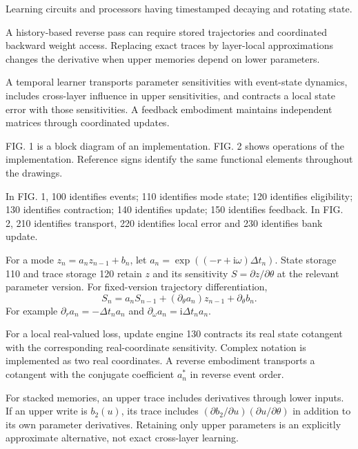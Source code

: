 \documentclass[pct]{sm-patent}
\begin{document}
\descriptionstart


\pnum Learning circuits and processors having timestamped decaying and rotating state.


\pnum A history-based reverse pass can require stored trajectories and coordinated backward weight access. Replacing exact traces by layer-local approximations changes the derivative when upper memories depend on lower parameters.


\pnum A temporal learner transports parameter sensitivities with event-state dynamics, includes cross-layer influence in upper sensitivities, and contracts a local state error with those sensitivities. A feedback embodiment maintains independent matrices through coordinated updates.


\pnum FIG. 1 is a block diagram of an implementation. FIG. 2 shows operations of the implementation. Reference signs identify the same functional elements throughout the drawings.


\pnum In FIG. 1, 100 identifies events; 110 identifies mode state; 120 identifies eligibility; 130 identifies contraction; 140 identifies update; 150 identifies feedback. In FIG. 2, 210 identifies transport, 220 identifies local error and 230 identifies bank update.

\pnum For a mode $z_n=a_nz_{n-1}+b_n$, let $a_n=\exp((-r+\mathrm{i}\omega)\Delta t_n)$. State storage 110 and trace storage 120 retain $z$ and its sensitivity $S=\partial z/\partial\theta$ at the relevant parameter version. For fixed-version trajectory differentiation,
\[S_n=a_n S_{n-1}+(\partial_\theta a_n)z_{n-1}+\partial_\theta b_n.\]
For example $\partial_r a_n=-\Delta t_n a_n$ and $\partial_\omega a_n=\mathrm{i}\Delta t_n a_n$.

\pnum For a local real-valued loss, update engine 130 contracts its real state cotangent with the corresponding real-coordinate sensitivity. Complex notation is implemented as two real coordinates. A reverse embodiment transports a cotangent with the conjugate coefficient $a_n^*$ in reverse event order.

\pnum For stacked memories, an upper trace includes derivatives through lower inputs. If an upper write is $b_2(u)$, its trace includes $(\partial b_2/\partial u)(\partial u/\partial\theta)$ in addition to its own parameter derivatives. Retaining only upper parameters is an explicitly approximate alternative, not exact cross-layer learning.
\end{document}
